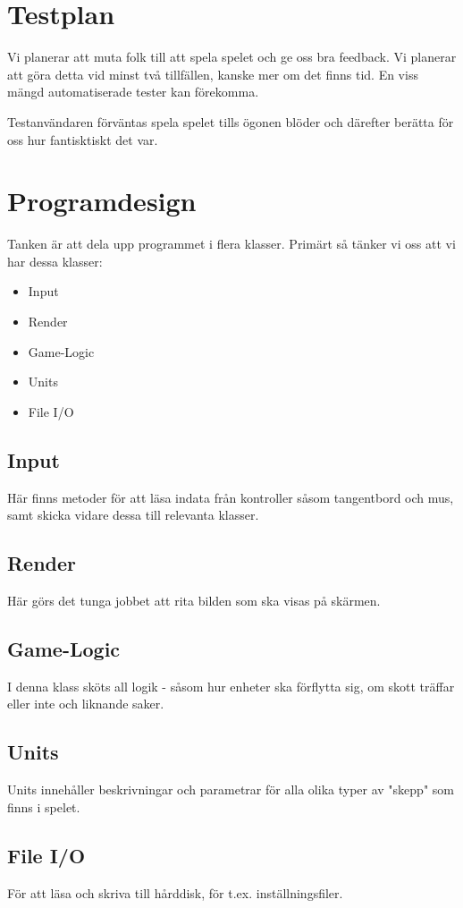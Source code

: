 \documentclass[a4paper,11pt]{article}
\begin{document}
\section{Testplan}
Vi planerar att muta folk till att spela spelet och ge oss bra feedback. Vi planerar att göra detta vid minst två tillfällen, kanske mer om det finns tid. En viss mängd automatiserade tester kan förekomma.

Testanvändaren förväntas spela spelet tills ögonen blöder och därefter berätta för oss hur fantisktiskt det var. 

\section{Programdesign}
Tanken är att dela upp programmet i flera klasser. Primärt så tänker vi oss att vi har dessa klasser:
\begin{multicols}{2}
\begin{itemize}
\item Input
\item Render
\item Game-Logic
\item Units
\item File I/O
\end{itemize}

\subsection{Input}
Här finns metoder för att läsa indata från kontroller såsom tangentbord och mus, samt skicka vidare dessa till relevanta klasser.

\subsection{Render}
Här görs det tunga jobbet att rita bilden som ska visas på skärmen.

\subsection{Game-Logic}
I denna klass sköts all logik - såsom hur enheter ska förflytta sig, om skott träffar eller inte och liknande saker.

\subsection{Units}
Units innehåller beskrivningar och parametrar för alla olika typer av "skepp" som finns i spelet.

\subsection{File I/O}
För att läsa och skriva till hårddisk, för t.ex. inställningsfiler.
\end{multicols}
\end{document}
